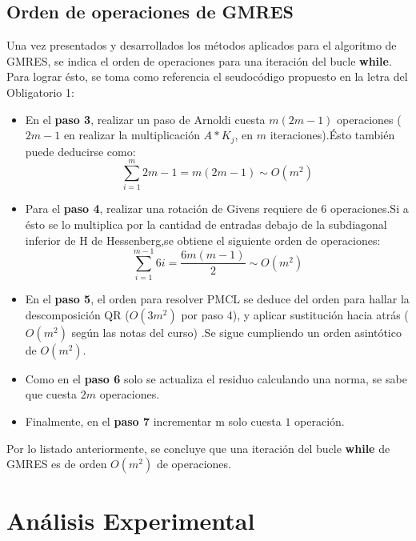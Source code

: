 \documentclass{endm}
\begin{document}
\subsection{Orden de operaciones de GMRES}
Una vez presentados y desarrollados los m\'etodos aplicados para el algoritmo de GMRES, se indica el orden 
de operaciones para una iteraci\'on del bucle \textbf{while}. Para lograr \'esto, se toma como referencia el
seudoc\'odigo propuesto en la letra del Obligatorio 1:\\
\begin{itemize}
    \item En el \textbf{paso 3}, realizar un paso de Arnoldi cuesta $m(2m-1)$ operaciones ($2m-1$ en realizar la
    multiplicaci\'on $A * K_j$, en $m$ iteraciones).\'Esto tambi\'en puede deducirse como:
    \begin{equation*}
        \sum^{m}_{i=1} 2m-1 = m(2m-1) \sim O(m^2)
    \end{equation*}
    \item Para el \textbf{paso 4}, realizar una rotaci\'on de Givens requiere de 6 operaciones.Si a \'esto se lo
    multiplica por la cantidad de entradas debajo de la subdiagonal inferior de H de Hessenberg,se obtiene el siguiente
    orden de operaciones:
    \begin{equation*}
        \sum^{m-1}_{i=1} 6i = \frac{6m(m-1)}{2} \sim O(m^2)
    \end{equation*}
    \item En el \textbf{paso 5}, el orden para resolver PMCL se deduce del orden para hallar la descomposici\'on QR 
    ($O(3m^2)$ por paso 4), y aplicar sustituci\'on hacia atr\'as ($O(m^2)$ seg\'un las notas del curso\cite{notasteo}) .Se sigue cumpliendo un orden asint\'otico de $O(m^2)$.
    \item Como en el \textbf{paso 6} solo se actualiza el residuo calculando una norma, se sabe que cuesta $2m$ operaciones.
    \item Finalmente, en el \textbf{paso 7} incrementar m solo cuesta $1$ operaci\'on.
    
\end{itemize}

Por lo listado anteriormente, se concluye que una iteraci\'on del bucle \textbf{while} de GMRES es de orden $O(m^2)$ de
operaciones.


\section{An\'alisis Experimental}\label{Comparison}
\end{document}
